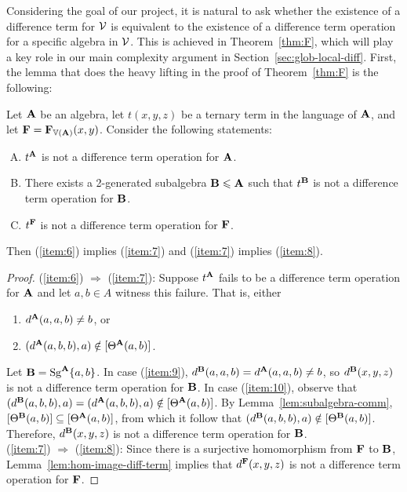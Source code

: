 Considering the goal of our project, it is natural
to ask whether the existence of a difference term for
 $\mathcal{V}$ is equivalent to the  existence  of a difference term
operation for a specific algebra in $\mathcal{V}$.  This is achieved in
Theorem~\ref{thm:F}, which will play a key role
in our main complexity argument in Section~\ref{sec:glob-local-diff}.
First, the lemma that does the heavy lifting in the proof of
Theorem~\ref{thm:F} is the following:
\begin{lem}
  \label{lem:equiv-cond-exist-1}
  Let $\mathbf{A}$ be an algebra, let $t(x,y,z)$ be a ternary term in the language
  of $\mathbf{A}$, and let $\mathbf{F} = \mathbf{F}_{\operatorname{\mathbb{V}}(\mathbf{A})}(x,y)$. Consider the following statements:
  \begin{enumerate}[(A)]
  \item \label{item:6} $t^{\mathbf{A}}$ is not a difference term operation for $\mathbf{A}$.
  \item \label{item:7} There exists a 2-generated subalgebra $\mathbf{B} \leqslant \mathbf{A}$
    such that $t^{\mathbf{B}}$ is not a difference term operation for $\mathbf{B}$.
  \item \label{item:8} $t^{\mathbf{F}}$ is not a difference term operation for $\mathbf{F}$.
  \end{enumerate}
  Then (\ref{item:6}) implies (\ref{item:7}) and (\ref{item:7}) implies (\ref{item:8}).
\end{lem}
\begin{proof}
  (\ref{item:6}) $\Rightarrow $ (\ref{item:7}):
  Suppose  $t^{\mathbf{A}}$ fails to be a difference term operation for $\mathbf{A}$ and let $a, b \in
  A$ witness this failure. That is, either
  \begin{enumerate}
  \item\label{item:9} $d^{\mathbf{A}}(a,a,b) \neq b$, or
  \item\label{item:10} $(d^{\mathbf{A}}(a,b,b), a) \notin [\Theta^{\mathbf{A}} (a, b)]$.
  \end{enumerate}
  Let $\mathbf{B} = \operatorname{Sg}^{\mathbf{A}} \{a, b\}$.  In case
  (\ref{item:9}),
  $d^{\mathbf{B}}(a,a,b) = d^{\mathbf{A}}(a,a,b) \neq b$, so $d^{\mathbf{B}}(x,y,z)$ is not a difference
  term operation for $\mathbf{B}$.
  In case (\ref{item:10}), observe that
  $(d^{\mathbf{B}}(a,b,b), a) = (d^{\mathbf{A}}(a,b,b), a)\notin [\Theta^{\mathbf{A}} (a, b)]$.
  By Lemma~\ref{lem:subalgebra-comm}, $[\Theta^{\mathbf{B}} (a, b)] \subseteq [\Theta^{\mathbf{A}} (a, b)]$,
  from which it follow that $(d^{\mathbf{B}}(a,b,b), a) \notin [\Theta^{\mathbf{B}} (a, b)]$.
  Therefore, $d^{\mathbf{B}}(x,y,z)$ is not a difference term operation for $\mathbf{B}$.
  \\[4pt]
  (\ref{item:7}) $\Rightarrow$ (\ref{item:8}):
  Since there is a surjective homomorphism from $\mathbf{F}$ to $\mathbf{B}$,
  Lemma~\ref{lem:hom-image-diff-term} implies that $d^{\mathbf{F}}(x,y,z)$
  is not a difference term operation for $\mathbf{F}$.
\end{proof}

